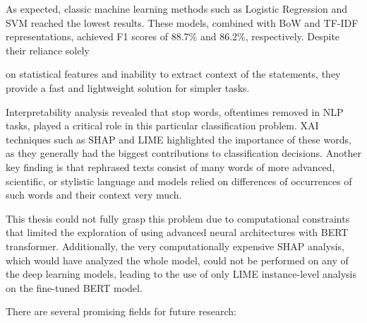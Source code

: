 \vspace{3mm}

As expected, classic machine learning methods such as Logistic Regression and SVM reached the lowest results. These models, combined with BoW and TF-IDF representations, achieved F1 scores of 88.7\% and 86.2\%, respectively. Despite their reliance solely

\newpage on statistical features and inability to extract context of the statements, they provide a fast and lightweight solution for simpler tasks.

\vspace{3mm}


Interpretability analysis revealed that stop words, oftentimes removed in NLP tasks, played a critical role in this particular classification problem. XAI techniques such as SHAP and LIME highlighted the importance of these words, as they generally had the biggest contributions to classification decisions. Another key finding is that rephrased texts consist of many words of more advanced, scientific, or stylistic language and models relied on differences of occurrences of such words and their context very much.

\vspace{3mm}


This thesis could not fully grasp this problem due to computational constraints that limited the exploration of using advanced neural architectures with BERT transformer. Additionally, the very computationally expensive SHAP analysis, which would have analyzed the whole model, could not be performed on any of the deep learning models, leading to the use of only LIME instance-level analysis on the fine-tuned BERT model.

\vspace{3mm}



There are several promising fields for future research:

\vspace{3mm}

